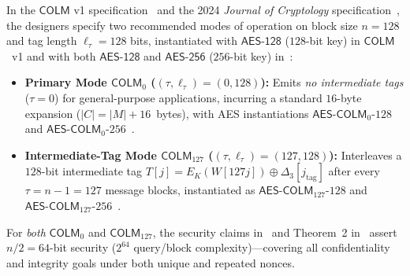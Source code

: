 \documentclass[11pt,a4paper]{article}
\theoremstyle{definition}
\theoremstyle{remark}
\newcommand{\COLM}{\mathsf{COLM}}
\newcommand{\COLMzero}{\mathsf{COLM}_0}
\newcommand{\COLMott}{\mathsf{COLM}_{127}}
\begin{document}
In the $\COLM$ v1 specification~\cite[Section~1.2, p.~2]{COLMv1} and the 2024 \emph{Journal of Cryptology} specification~\cite[Section~3.1, pp.~9--14; Section~5.1, p.~27]{COLM24}, the designers specify two recommended modes of operation on block size $n = 128$ and tag length $\ell_\tau = 128$ bits, instantiated with $\mathsf{AES\text{-}128}$ ($128$-bit key) in $\COLM$~v1 and with both $\mathsf{AES\text{-}128}$ and $\mathsf{AES\text{-}256}$ ($256$-bit key) in~\cite{COLM24}:
\begin{itemize}[leftmargin=2em]
    \item \textbf{Primary Mode $\COLMzero$ ($(\tau, \ell_\tau) = (0, 128)$):} Emits \emph{no intermediate tags} ($\tau = 0$) for general-purpose applications, incurring a standard $16$-byte expansion ($|C| = |M| + 16$~bytes), with AES instantiations $\mathsf{AES\text{-}COLM}_0\text{-}128$ and $\mathsf{AES\text{-}COLM}_0\text{-}256$~\cite{COLM24}.
    \item \textbf{Intermediate-Tag Mode $\COLMott$ ($(\tau, \ell_\tau) = (127, 128)$):} Interleaves a $128$-bit intermediate tag $T[j] = E_K(W[127j]) \oplus \Delta_3[j_{\mathrm{tag}}]$ after every $\tau = n - 1 = 127$ message blocks, instantiated as $\mathsf{AES\text{-}COLM}_{127}\text{-}128$ and $\mathsf{AES\text{-}COLM}_{127}\text{-}256$~\cite{COLM24}.
\end{itemize}
For \emph{both} $\COLMzero$ and $\COLMott$, the security claims in~\cite[Section~3, p.~10]{COLMv1} and Theorem~2 in~\cite[Section~4, p.~15]{COLM24} assert $n/2 = 64$-bit security ($2^{64}$ query/block complexity)---covering all confidentiality and integrity goals under both unique and repeated nonces.
\end{document}
